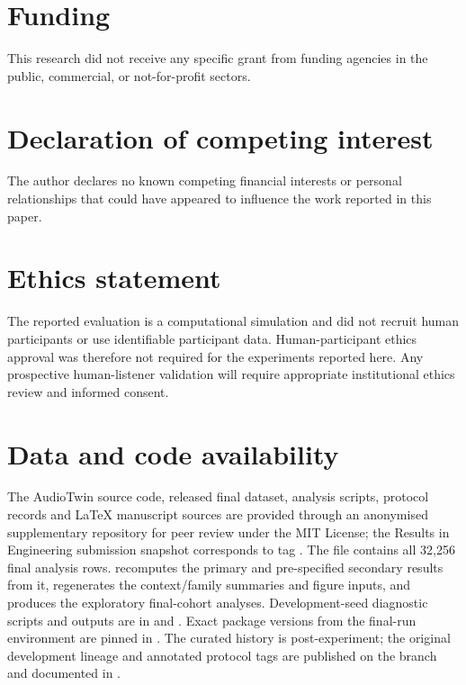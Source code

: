 \documentclass[preprint,12pt]{elsarticle}
\begin{document}
\section*{Funding}
This research did not receive any specific grant from funding agencies in the public, commercial, or not-for-profit sectors.

\section*{Declaration of competing interest}
The author declares no known competing financial interests or personal relationships that could have appeared to influence the work reported in this paper.

\section*{Ethics statement}
The reported evaluation is a computational simulation and did not recruit human participants or use identifiable participant data. Human-participant ethics approval was therefore not required for the experiments reported here. Any prospective human-listener validation will require appropriate institutional ethics review and informed consent.

\section*{Data and code availability}
The AudioTwin source code, released final dataset, analysis scripts, protocol records and LaTeX manuscript sources are provided through an anonymised supplementary repository for peer review under the MIT License; the Results in Engineering submission snapshot corresponds to tag . The file  contains all 32,256 final analysis rows.  recomputes the primary and pre-specified secondary results from it,  regenerates the context/family summaries and figure inputs, and  produces the exploratory final-cohort analyses. Development-seed diagnostic scripts and outputs are in  and . Exact package versions from the final-run environment are pinned in . The curated  history is post-experiment; the original development lineage and annotated protocol tags are published on the  branch and documented in .
\end{document}
